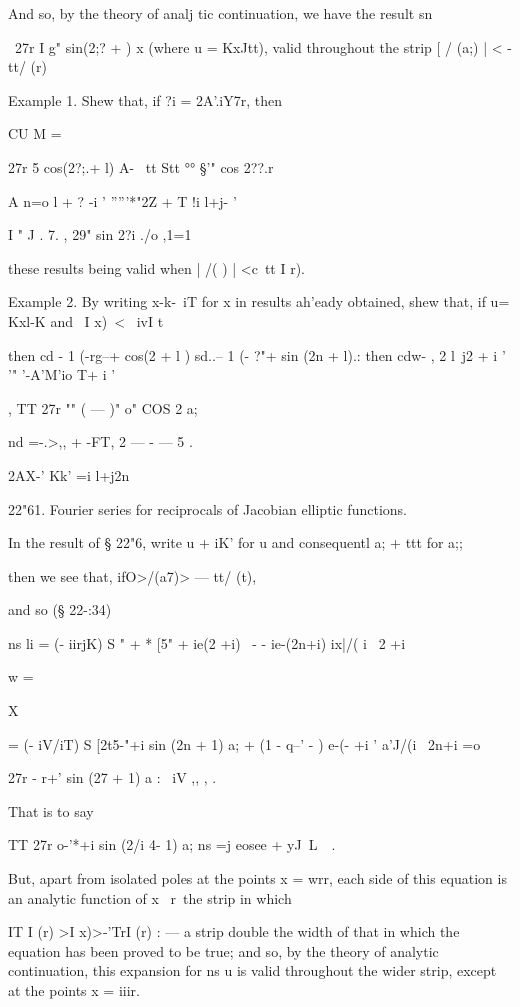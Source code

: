And so, by the theory of analj tic continuation, we have the result sn

\ 27r I g" sin(2;? + ) x (where u = KxJtt), valid throughout the strip
[ / (a;) | < - tt/ (r)

Example 1. Shew that, if ?i = 2A'.iY7r, then

CU M =

27r 5 cos(2?;.+ l) A- \ tt Stt °° §'" cos 2??.r

A n=o l + ? -i ' '''''*"2Z + T !i l+j- '

I " J . 7. , 29" sin 2?i ./o ,1=1 %

these results being valid when | /( ) | <c\ tt I r).

Example 2. By writing x-k-\ iT for x in results ah'eady obtained, shew
that, if u= Kxl-K and \ I x)\ < \ ivI t\

then cd - 1 (-rg--+ cos(2 + l ) sd..-- 1 (- ?"+ sin (2n + l).: then
cdw- , 2 l\ j2 + i ' '" '-A'M'io T+ i '

, TT 27r "" ( — )" o" COS 2 a;

nd =-.>,, + -FT, 2 — - — 5 .

2AX-' Kk' =i l+j2n

22"61. Fourier series for reciprocals of Jacobian elliptic functions.

In the result of § 22"6, write u + iK' for u and consequentl a; + ttt
for a;;

then we see that, ifO>/(a7)> — tt/ (t),

and so (§ 22-:34)

ns li = (- iirjK) S " + * [5" + ie(2 +i) \ - - ie-(2n+i) ix|/( i \ 2
+i

w =

X

= (- iV/iT) S [2t5-"+i sin (2n + 1) a; + (1 - q--' - ) e-(- +i '
a'J/(i \ 2n+i =o

  27r - r+' sin (27 + 1) a : \ iV ,, , .

That is to say

TT 27r o-'*+i sin (2/i 4- 1) a; ns =j eosee + yJ\ L\ \ .

But, apart from isolated poles at the points x = wrr, each side of
this equation is an analytic function of x \ r\ the strip in which

IT I (r) >I x)>-'TrI (r) : — a strip double the width of that in which
the equation has been proved to be true; and so, by the theory of
analytic continuation, this expansion for ns u is valid throughout the
wider strip, except at the points x = iiir.

